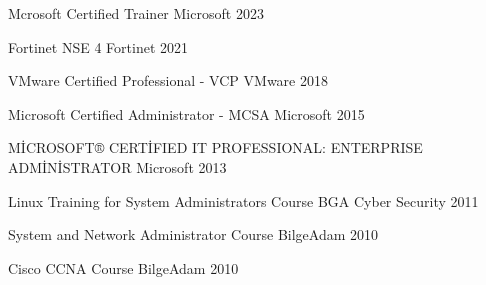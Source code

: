 

\begin{cvhonors}

  \cvhonor
    {Mcrosoft Certified Trainer} %
    {Microsoft} %
    {} %
    {2023} %

  \cvhonor
    {Fortinet NSE 4} %
    {Fortinet} %
    {} %
    {2021} %

  \cvhonor
    {VMware Certified Professional - VCP} %
    {VMware} %
    {} %
    {2018} %

  \cvhonor
    {Microsoft Certified Administrator - MCSA } %
    {Microsoft} %
    {} %
    {2015} %

  \cvhonor
    {MİCROSOFT® CERTİFIED IT PROFESSIONAL: ENTERPRISE ADMİNİSTRATOR } %
    {Microsoft} %
    {} %
    {2013} %

 
  \cvhonor
    {Linux Training for System Administrators Course} %
    {BGA Cyber Security} %
    {} %
    {2011} %


  \cvhonor
    {System and Network Administrator Course} %
    {BilgeAdam} %
    {} %
    {2010} %


\cvhonor
    {Cisco CCNA Course} %
    {BilgeAdam} %
    {} %
    {2010} %


\end{cvhonors}

